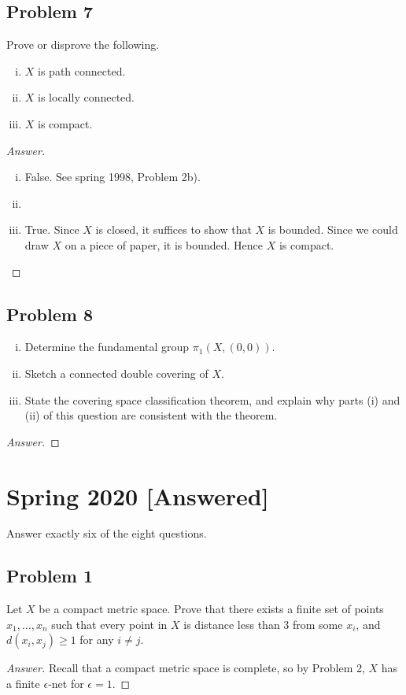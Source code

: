 \documentclass[12pt]{article}
\newcommand\paren[1]{\left( #1 \right)}
\theoremstyle{definition}
\begin{document}
\subsection{Problem 7}
Prove or disprove the following.
\begin{enumerate}[(i)]
    \item $X$ is path connected.
    \item $X$ is locally connected.
    \item $X$ is compact.
\end{enumerate}
\begin{proof}[Answer]
    \noindent
    \begin{enumerate}[(i)]
        \item False. See spring 1998, Problem 2b).
        \item 
        \item True. Since $X$ is closed, it suffices to show that $X$ is bounded. Since we could draw $X$ on a piece of paper, it is bounded. Hence $X$ is compact.
    \end{enumerate}
\end{proof}
\subsection{Problem 8}
\begin{enumerate}[(i)]
    \item Determine the fundamental group $\pi_1(X,(0,0))$.
    \item Sketch a connected double covering of $X$.
    \item State the covering space classification theorem, and explain why parts (i) and (ii) of this question are consistent with the theorem.
\end{enumerate}
\begin{proof}[Answer]
    
\end{proof}
\newpage
\section{Spring 2020 [Answered]}
Answer exactly six of the eight questions.
\subsection{Problem 1}
Let $X$ be a compact metric space. Prove that there exists a finite set of points $x_1 , \dotsc , x_n$ such that every point in $X$ is distance less than 3 from some $x_i$, and $d \paren{ x_i , x_j } \geq 1$ for any $i \neq j$.
\begin{proof}[Answer]
    Recall that a compact metric space is complete, so by Problem 2, $X$ has a finite $\epsilon$-net for $\epsilon = 1$.
\end{proof}
\end{document}
